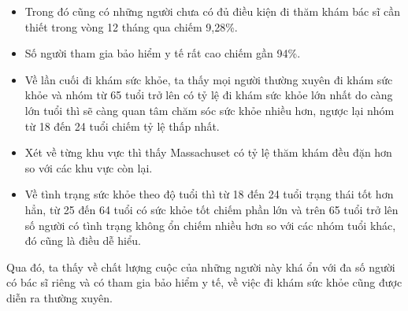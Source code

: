 \begin{enumerate}
\begin{itemize}[label=$-$]
        \item Trong đó cũng có những người chưa có đủ điều kiện đi thăm khám bác sĩ cần thiết trong vòng 12 tháng qua chiếm 9,28\%.
        
        \item Số người tham gia bảo hiểm y tế rất cao chiếm gần 94\%.
        
        \item Về lần cuối đi khám sức khỏe, ta thấy mọi người thường xuyên đi khám sức khỏe và nhóm từ 65 tuổi trở lên có tỷ lệ đi khám sức khỏe lớn nhất do càng lớn tuổi thì sẽ càng quan tâm chăm sóc sức khỏe nhiều hơn, ngược lại nhóm từ 18 đến 24 tuổi chiếm tỷ lệ thấp nhất.
        
        \item Xét về từng khu vực thì thấy Massachuset có tỷ lệ thăm khám đều đặn hơn so với các khu vực còn lại.
        
        \item Về tình trạng sức khỏe theo độ tuổi thì từ 18 đến 24 tuổi trạng thái tốt hơn hẳn, từ 25 đến 64 tuổi có sức khỏe tốt chiếm phần lớn và trên 65 tuổi trở lên số người có tình trạng không ổn chiếm nhiều hơn so với các nhóm tuổi khác, đó cũng là điều dễ hiểu.
    \end{itemize}
 Qua đó, ta thấy về chất lượng cuộc của những người này khá ổn với đa số người có bác sĩ riêng và có tham gia bảo hiểm y tế, về việc đi khám sức khỏe cũng được diễn ra thường xuyên.
    

\end{enumerate}
